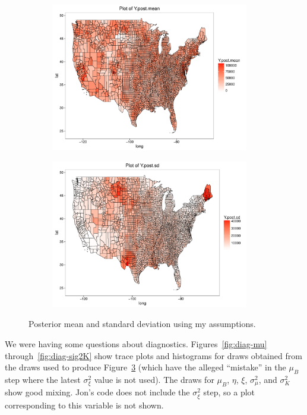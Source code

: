 \documentclass[10pt]{article}
\begin{document}
\begin{figure}
\centering
\begin{subfigure}[b]{.95\textwidth}
  \centering
  \includegraphics[width=0.95\textwidth]{figures/post-mean.pdf}
  \label{fig:post-mean}
\end{subfigure}

\begin{subfigure}[b]{.95\textwidth}
  \centering
  \includegraphics[width=0.95\textwidth]{figures/post-sd.pdf}
  \label{fig:post-sd}
\end{subfigure}
\caption{Posterior mean and standard deviation using my assumptions.}
\label{fig:post}
\end{figure}

We were having some questions about diagnostics. Figures~\ref{fig:diag-mu}
through~\ref{fig:diag-sig2K} show
trace plots and histograms for draws obtained from the draws used to produce
Figure~\ref{fig:post} (which have the alleged ``mistake'' in the $\mu_B$ step
where the latest $\sigma_\xi^2$ value is not used). The draws for $\mu_B$,
$\eta$, $\xi$, $\sigma_\mu^2$, and $\sigma_K^2$ show good mixing. Jon's code
does not include the $\sigma_\xi^2$ step, so a plot corresponding to this
variable is not shown.
\end{document}
